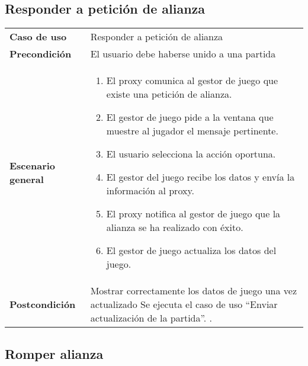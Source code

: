 \subsection{Responder a petición de alianza}

{\footnotesize
\begin{tabularx}{0.95\textwidth}{p{}|X}
\textbf{Caso de uso} & Responder a petición de alianza \\

\textbf{Precondición} & El usuario debe haberse unido a una partida \\

\textbf{Escenario general} & \begin{enumerate}
\item El proxy comunica al gestor de juego que existe una petición de alianza.
\item El gestor de juego pide a la ventana que muestre al jugador el mensaje
pertinente.
\item El usuario selecciona la acción oportuna.
\item El gestor del juego recibe los datos y envía la información al proxy.
\item El proxy notifica al gestor de juego que la alianza se ha realizado con
éxito.
\item El gestor de juego actualiza los datos del juego.
\end{enumerate} \\
\textbf{Postcondición} & Mostrar correctamente los datos de juego una vez
actualizado Se ejecuta el caso de uso  ``Enviar actualización de
la partida''. .
\end{tabularx}
}

\subsection{Romper alianza}

